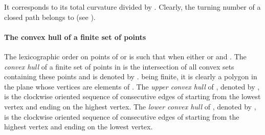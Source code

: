  It corresponds to its total curvature divided by . Clearly, the turning number  of a closed path  belongs to   (see \cite{bll2,bll3}). 




\paragraph{The convex hull of a finite set of points}The lexicographic order  on points of  or  is such
 that  when either  or  and . The {\em convex hull} of a finite set  of points in 
 is the intersection of all
 convex sets containing these points and is denoted by
 .  being finite, it is clearly a polygon in the
 plane whose vertices are elements of . The {\em upper convex
 hull} of , denoted by , is the clockwise oriented
 sequence of consecutive edges of  starting from the
 lowest vertex and ending on the highest vertex. The {\em lower
 convex hull} of , denoted by , is the clockwise
 oriented sequence of consecutive edges of  starting
 from the highest vertex and ending on the lowest vertex.


